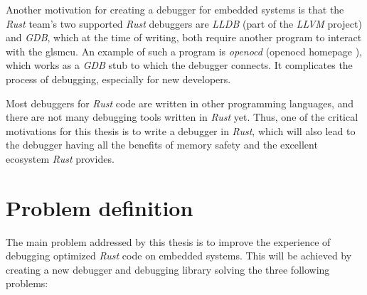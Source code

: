 Another motivation for creating a debugger for embedded systems is that the \emph{Rust} team's two supported \emph{Rust} debuggers are \emph{LLDB} (part of the \emph{LLVM} project) and \emph{GDB}, which at the time of writing, both require another program to interact with the gls{mcu}.
An example of such a program is \emph{openocd} (openocd homepage \cite{openocd}), which works as a \emph{GDB} stub to which the debugger connects.
It complicates the process of debugging, especially for new developers.


Most debuggers for \emph{Rust} code are written in other programming languages, and there are not many debugging tools written in \emph{Rust} yet.
Thus, one of the critical motivations for this thesis is to write a debugger in \emph{Rust}, which will also lead to the debugger having all the benefits of memory safety and the excellent ecosystem \emph{Rust} provides.


\section{Problem definition} \label{sec:problemDef}
 

The main problem addressed by this thesis is to improve the experience of debugging optimized \emph{Rust} code on embedded systems.
This will be achieved by creating a new debugger and debugging library solving the three following problems:

